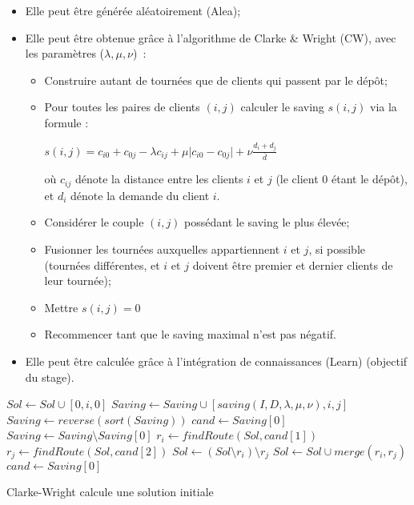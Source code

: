 \documentclass[a4paper,11pt]{article}%
\begin{document}
\begin{itemize}
\item Elle peut être générée aléatoirement (Alea);
\item Elle peut être obtenue grâce à l'algorithme de Clarke \& Wright (CW), avec les paramètres ($\lambda,\mu,\nu$)~\cite{Altinel_2005}: 
\begin{itemize}
\item Construire autant de tournées que de clients qui passent par le dépôt;
\item Pour toutes les paires de clients $(i,j)$ calculer le saving $s(i,j)$ via la formule : 
\begin{center}
$s(i,j) = c_{i0} + c_{0j} - \lambda c_{ij} + \mu \vert c_{i0} - c_{0j} \vert + \nu \frac{d_i + d_j}{\overline{d}}$
\end{center}
où $c_{ij}$ dénote la distance entre les clients $i$ et $j$ (le client 0 étant le dépôt), et $d_i$ dénote la demande du client $i$.
\item Considérer le couple $(i,j)$ possédant le saving le plus élevée;
\item Fusionner les tournées auxquelles appartiennent $i$ et $j$, si possible (tournées différentes, et $i$ et $j$ doivent être premier et dernier clients de leur tournée);
\item Mettre $s(i,j) = 0$
\item Recommencer tant que le saving maximal n'est pas négatif.
\end{itemize}
\item Elle peut être calculée grâce à l'intégration de connaissances (Learn) (objectif du stage).
\end{itemize}

\begin{algorithm}
\DontPrintSemicolon %

 {
	$Sol \gets Sol \cup [0,i,0]$\;
}
 {
	 {
		$Saving \gets Saving \cup [saving(I,D,\lambda,\mu,\nu),i,j]$\;
		}
	}
$Saving \gets reverse(sort(Saving))$\;
$ cand \gets Saving[0] $\;
 {
	$Saving \gets Saving \setminus Saving[0]$\;
	$r_i \gets findRoute(Sol,cand[1])$\;
	$r_j \gets findRoute(Sol,cand[2])$\;
	 {
		$ Sol \gets (Sol \setminus r_i) \setminus r_j$\;
		$ Sol \gets Sol \cup merge(r_i,r_j)$\;
	}
	$ cand \gets Saving[0]$\;
}

\;
\caption{{\sc Clarke-Wright} calcule une solution initiale}
\label{algo:max}
\end{algorithm}
\end{document}
